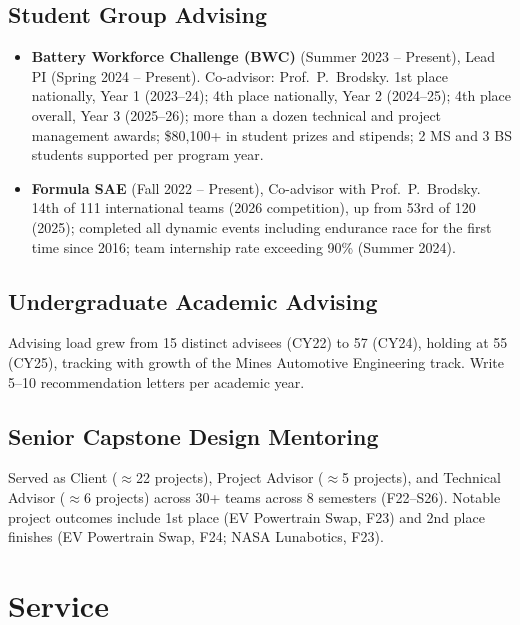 \documentclass[11pt,letterpaper]{article}
\begin{document}
\subsection{Student Group Advising}

\begin{itemize}
  \item \textbf{Battery Workforce Challenge (BWC)} (Summer 2023 -- Present), Lead PI
        (Spring 2024 -- Present). Co-advisor: Prof.\ P.\ Brodsky. 1st place nationally,
        Year 1 (2023--24); 4th place nationally, Year 2 (2024--25); 4th place overall,
        Year 3 (2025--26); more than a dozen technical and project management awards;
        \$80,100+ in student prizes and stipends; 2 MS and 3 BS students supported per
        program year.

  \item \textbf{Formula SAE} (Fall 2022 -- Present), Co-advisor with Prof.\ P.\ Brodsky.
        14th of 111 international teams (2026 competition), up from 53rd of 120 (2025);
        completed all dynamic events including endurance race for the first time since
        2016; team internship rate exceeding 90\% (Summer 2024).
\end{itemize}

\subsection{Undergraduate Academic Advising}

\noindent Advising load grew from 15 distinct advisees (CY22) to 57 (CY24), holding at
55 (CY25), tracking with growth of the Mines Automotive Engineering track. Write 5--10
recommendation letters per academic year.

\subsection{Senior Capstone Design Mentoring}

\noindent Served as Client ($\approx$22 projects), Project Advisor ($\approx$5 projects),
and Technical Advisor ($\approx$6 projects) across 30+ teams across 8 semesters (F22--S26).
Notable project outcomes include 1st place (EV Powertrain Swap, F23) and 2nd place
finishes (EV Powertrain Swap, F24; NASA Lunabotics, F23).

\section{Service}
\end{document}
